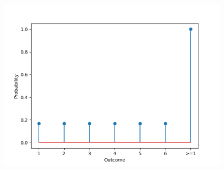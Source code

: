 \documentclass[journal]{IEEEtran}
\begin{document}
	\begin{figure}[h!]
		\centering
		\includegraphics[width=\columnwidth]{figs/Fig.png}
		\label{stemplot}
	\end{figure}
	
\end{document}
